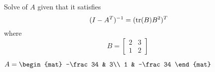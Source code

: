 
\begin{Exercise}[
name={},
title={}, 
difficulty=0,
origin={\cite{YL}}]
Solve of $A$ given that it satisfies
\[
(I-A^T)^{-1} = (\operatorname{tr}(B)B^2)^T
\]
where
\[
B=
\begin{bmatrix}
2 & 3\\
1 & 2
\end{bmatrix}\;
\]

\end{Exercise}

\begin{Answer}
$
A=
\begin{mat}
-\frac34 & 3\\
1 & -\frac34
\end{mat}
$
\end{Answer}
